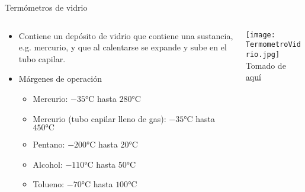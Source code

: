 \documentclass[aspectratio=169]{beamer}
\begin{document}
\begin{frame}{Termómetros de vidrio}
    \begin{columns}[c, onlytextwidth]
        \begin{column}{0.5\textwidth}
            \begin{itemize}
                \item Contiene un depósito de vidrio que contiene una sustancia, e.g. mercurio, y que al calentarse se expande y sube en el tubo capilar.  
                \item Márgenes de operación \cite{sole2005instrumentacion}
                \begin{itemize}
                    \item Mercurio: $-35\si{\celsius}$ hasta $280\si{\celsius}$
                    \item Mercurio (tubo capilar lleno de gas): $-35\si{\celsius}$ hasta $450\si{\celsius}$
                    \item Pentano: $-200\si{\celsius}$ hasta $20\si{\celsius}$
                    \item Alcohol: $-110\si{\celsius}$ hasta $50\si{\celsius}$
                    \item Tolueno: $-70\si{\celsius}$ hasta $100\si{\celsius}$
                \end{itemize}
            \end{itemize}
        \end{column}
        \begin{column}{0.45\textwidth}
            \centering
            \texttt{[image: TermometroVidrio.jpg]}
             \\ \tiny{Tomado de \href{http://famater.com.ar/?p=611}{aquí}}
        \end{column}
    \end{columns}
\end{frame}
\end{document}
